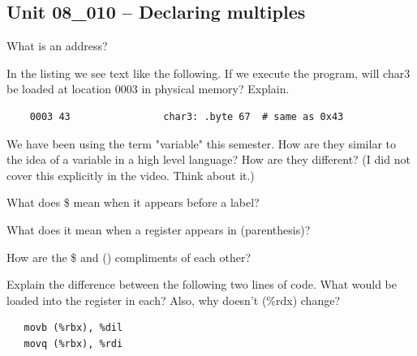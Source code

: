 \documentclass[letterpaper,12pt]{exam}
\newcommand{\unit}{Unit 08}
\begin{document}

\par{\selectfont\textbf{}}
\begin{questions}

\section*{\unit\_010 -- Declaring multiples }
\begin{samepage}
    \question What is an address?
    \vspace{5mm}
\end{samepage}
\par
\begin{samepage}
    \question In the listing we see text like the following.  If we execute the program, will char3 be loaded at location 0003 in physical memory?  Explain.
\begin{verbatim}
    0003 43                char3: .byte 67  # same as 0x43
\end{verbatim}
    \vspace{5mm}
\end{samepage}
\par
\begin{samepage}
    \question We have been using the term "variable" this semester.  How are they similar to the idea of a variable in a high level language?  How are they different? (I did not cover this explicitly in the video.  Think about it.)
    \vspace{5mm}
\end{samepage}
\begin{samepage}
    \question What does \$ mean when it appears before a label?
    \vspace{5mm}
\end{samepage}
\par
\begin{samepage}
    \question What does it mean when a register appears in (parenthesis)?
    \vspace{5mm}
\end{samepage}
\par
 \begin{samepage}
     \question How are the \$ and () compliments of each other?
     \vspace{5mm}
 \end{samepage}
 \par
\begin{samepage}
    \question Explain the difference between the following two lines of code.  What would be loaded into the register in each?  Also, why doesn't (\%rdx) change?
    \begin{verbatim}
   movb (%rbx), %dil
   movq (%rbx), %rdi


\end{verbatim}
\end{samepage}
\end{questions}
\end{document}
